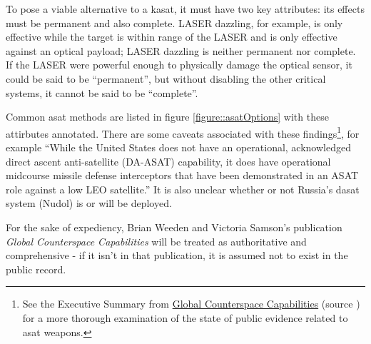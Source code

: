 To pose a viable alternative to a \ac{kasat}, it must have two key
attributes: its effects must be permanent and also complete.  LASER
dazzling, for example, is only effective while the target is within
range of the LASER and is only effective against an optical payload;
LASER dazzling is neither permanent nor complete.  If the LASER were
powerful enough to physically damage the optical sensor, it could be
said to be ``permanent'', but without disabling the other critical
systems, it cannot be said to be ``complete''.

Common \ac{asat} methods are listed in figure
\ref{figure::asatOptions} with these attirbutes annotated.  There are
some caveats associated with these findings\footnote{See the Executive
Summary from
\href{https://swfound.org/media/207344/swf_global_counterspace_capabilities_2022.pdf}{Global
  Counterspace Capabilities} (source \cite{brian}) for a more thorough
examination of the state of public evidence related to \acl{asat}
weapons.}, for example ``While the United States does not have an
operational, acknowledged direct ascent anti-satellite (DA-ASAT)
capability, it does have operational midcourse missile defense
interceptors that have been demonstrated in an ASAT role against a low
LEO satellite.''\cite[pxiii]{brian} It is also unclear whether or not
Russia's \ac{dasat} system (Nudol) is or will be
deployed.\cite[pxv]{brian}

For the sake of expediency, Brian Weeden and Victoria Samson's
publication {\it Global Counterspace Capabilities}\cite{brian} will be
treated as authoritative and comprehensive - if it isn't in that
publication, it is assumed not to exist in the public record.

